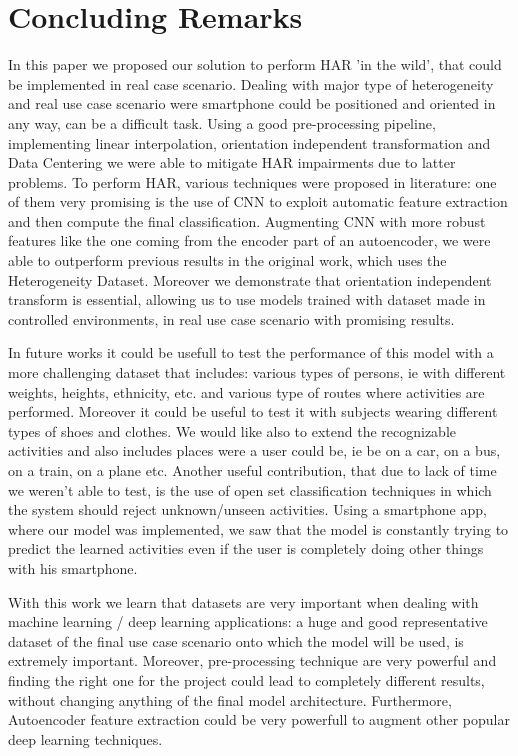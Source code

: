 
\section{Concluding Remarks}
\label{sec:conclusions}

In this paper we proposed our solution to perform HAR 'in the wild', that could be implemented in real case scenario. Dealing with major type of heterogeneity and real use case scenario were smartphone could be positioned and oriented in any way, can be a difficult task. Using a good pre-processing pipeline, implementing linear interpolation, orientation independent transformation and Data Centering we were able to mitigate HAR impairments due to latter problems. To perform HAR, various techniques were proposed in literature: one of them very promising is the use of CNN to exploit automatic feature extraction and then compute the final classification. Augmenting CNN with more robust features like the one coming from the encoder part of an autoencoder, we were able to outperform previous results in the original work, which uses the Heterogeneity Dataset. Moreover we demonstrate that orientation independent transform is essential, allowing us to use models trained with dataset made in controlled environments, in real use case scenario with promising results. 

In future works it could be usefull to test the performance of this model with a more challenging dataset that includes: various types of persons, ie with different weights, heights, ethnicity, etc. and various type of routes where activities are performed. Moreover it could be useful to test it with subjects wearing different types of shoes and clothes. We would like also to extend the recognizable activities and also includes places were a user could be, ie be on a car, on a bus, on a train, on a plane etc. Another useful contribution, that due to lack of time we weren't able to test, is the use of open set classification techniques in which the system should reject unknown/unseen activities. Using a smartphone app, where our model was implemented, we saw that the model is constantly trying to predict the learned activities even if the user is completely doing other things with his smartphone.

With this work we learn that datasets are very important when dealing with machine learning / deep learning applications: a huge and good representative dataset of the final use case scenario onto which the model will be used, is extremely important. Moreover, pre-processing technique are very powerful and finding the right one for the project could lead to completely different results, without changing anything of the final model architecture. Furthermore, Autoencoder feature extraction could be very powerfull to augment other popular deep learning techniques.

